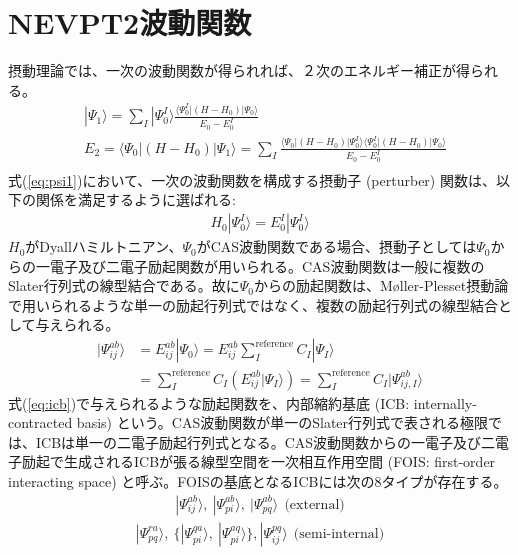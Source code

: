 \documentclass[11pt,pra,aps]{revtex4}
\begin{document}
\section{NEVPT2波動関数}

摂動理論では、一次の波動関数が得られれば、２次のエネルギー補正が得られる。
\begin{align}
  & |\Psi_1\rangle = \sum_I |\Psi_0^I\rangle\frac{\langle\Psi_0^I|\left(H-H_0\right)|\Psi_0\rangle}{E_0-E_0^I} \label{eq:psi1} \\
  & E_2 = \langle\Psi_0|\left(H-H_0\right)|\Psi_1\rangle = \sum_I \frac{\langle\Psi_0|\left(H-H_0\right)|\Psi_0^I\rangle\langle\Psi_0^I|\left(H-H_0\right)|\Psi_0\rangle}{E_0-E_0^I} \\
\end{align}
式(\ref{eq:psi1})において、一次の波動関数を構成する摂動子 (perturber) 関数は、以下の関係を満足するように選ばれる:
\begin{align}
  H_0|\Psi_0^I\rangle=E_0^I|\Psi_0^I\rangle \label{eq:eigen}
\end{align}
$H_0$がDyallハミルトニアン、$\Psi_0$がCAS波動関数である場合、摂動子としては$\Psi_0$からの一電子及び二電子励起関数が用いられる。CAS波動関数は一般に複数のSlater行列式の線型結合である。故に$\Psi_0$からの励起関数は、M\o ller-Plesset摂動論で用いられるような単一の励起行列式ではなく、複数の励起行列式の線型結合として与えられる。
\begin{align}
  |\Psi_{ij}^{ab}\rangle&=E_{ij}^{ab}|\Psi_0\rangle=E_{ij}^{ab}\sum_I^\text{reference} C_I|\Psi_I\rangle \nonumber \\
  &=\sum_I^\text{reference} C_I\left(E_{ij}^{ab}|\Psi_I\rangle\right)=\sum_I^\text{reference} C_I|\Psi_{ij,I}^{ab}\rangle \label{eq:icb}
\end{align}
式(\ref{eq:icb})で与えられるような励起関数を、内部縮約基底 (ICB: internally-contracted basis) という。CAS波動関数が単一のSlater行列式で表される極限では、ICBは単一の二電子励起行列式となる。CAS波動関数からの一電子及び二電子励起で生成されるICBが張る線型空間を一次相互作用空間 (FOIS: first-order interacting space) と呼ぶ。FOISの基底となるICBには次の8タイプが存在する。
\begin{align}
  |\Psi_{ij}^{ab}\rangle,\ |\Psi_{pi}^{ab}\rangle,\ |\Psi_{pq}^{ab}\rangle \ \ \text{(external)} \label{eq:ext}
\end{align}
\begin{align}
  |\Psi_{pq}^{ra}\rangle,\ \{|\Psi_{pi}^{qa}\rangle,\ |\Psi_{pi}^{aq}\rangle\}, |\Psi_{ij}^{pq}\rangle \ \ \text{(semi-internal)} \label{eq:semi-int}
\end{align}
\end{document}
